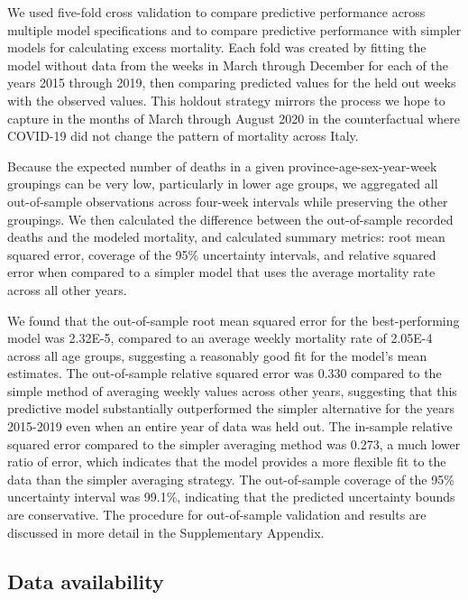 \documentclass[
]{article}
\begin{document}
We used five-fold cross validation to compare predictive performance across multiple model specifications and to compare predictive performance with simpler models for calculating excess mortality. Each fold was created by fitting the model without data from the weeks in March through December for each of the years 2015 through 2019, then comparing predicted values for the held out weeks with the observed values. This holdout strategy mirrors the process we hope to capture in the months of March through August 2020 in the counterfactual where COVID-19 did not change the pattern of mortality across Italy.

Because the expected number of deaths in a given province-age-sex-year-week groupings can be very low, particularly in lower age groups, we aggregated all out-of-sample observations across four-week intervals while preserving the other groupings. We then calculated the difference between the out-of-sample recorded deaths and the modeled mortality, and calculated summary metrics: root mean squared error, coverage of the 95\% uncertainty intervals, and relative squared error when compared to a simpler model that uses the average mortality rate across all other years.

We found that the out-of-sample root mean squared error for the best-performing model was 2.32E-5, compared to an average weekly mortality rate of 2.05E-4 across all age groups, suggesting a reasonably good fit for the model's mean estimates. The out-of-sample relative squared error was 0.330 compared to the simple method of averaging weekly values across other years, suggesting that this predictive model substantially outperformed the simpler alternative for the years 2015-2019 even when an entire year of data was held out. The in-sample relative squared error compared to the simpler averaging method was 0.273, a much lower ratio of error, which indicates that the model provides a more flexible fit to the data than the simpler averaging strategy. The out-of-sample coverage of the 95\% uncertainty interval was 99.1\%, indicating that the predicted uncertainty bounds are conservative. The procedure for out-of-sample validation and results are discussed in more detail in the Supplementary Appendix.

\hypertarget{data-availability}{%
\subsection{Data availability}\label{data-availability}}
\end{document}
